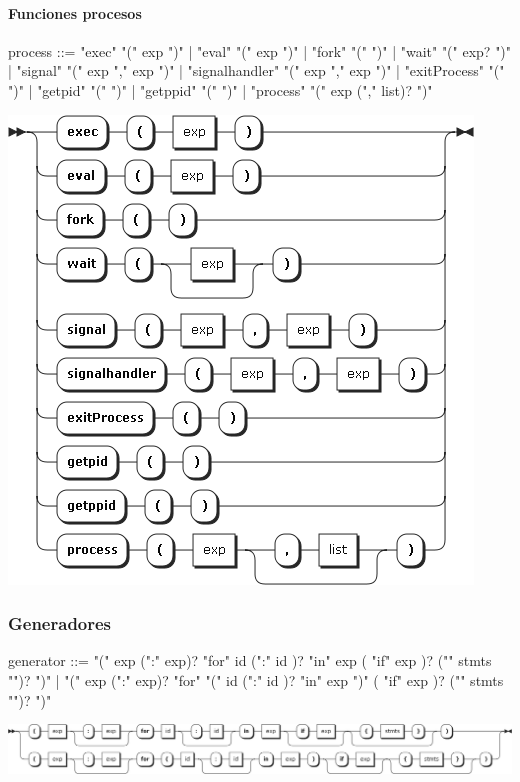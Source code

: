 \paragraph{Funciones procesos}
\begin{multicols}{2}
\begin{myverbatim}[style=nonumbers, basicstyle=\tiny]      
process ::= "exec" "(" exp ")"
         |  "eval" "(" exp ")"
         |  "fork" "(" ")"
         |  "wait" "(" exp? ")"
         |  "signal" "(" exp "," exp ")"
         |  "signalhandler" "(" exp "," exp ")"
         |  "exitProcess" "(" ")"
         |  "getpid" "(" ")"
         |  "getppid" "(" ")"
         |  "process" "(" exp ("," list)? ")"
\end{myverbatim}  
\columnbreak	
\begin{center}
\includegraphics[scale=0.4]{diagram/process.png} \\
\end{center}
\end{multicols}

\subsubsection{Generadores}
\begin{myverbatim}[style=nonumbers, basicstyle=\tiny]      
generator ::= "(" exp (":" exp)? "for" id (":" id )? "in" exp ( "if" exp )? ("{" stmts "}")? ")"
   | "(" exp (":" exp)? "for" "(" id (":" id )? "in" exp ")" ( "if" exp )? ("{" stmts "}")? ")"
\end{myverbatim}  
\begin{center}
\includegraphics[scale=0.4]{diagram/generator.png} \\
\end{center}
